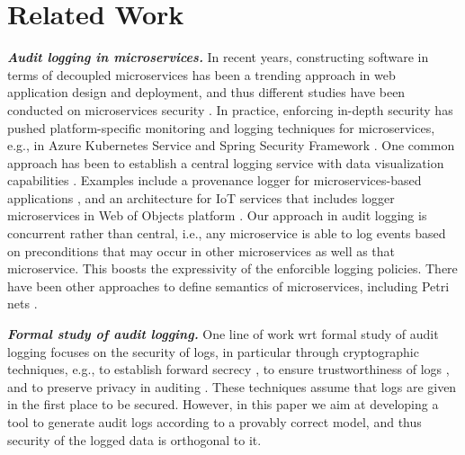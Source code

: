 \section{Related Work} \label{sec:relwork}

\textbf{\textit{Audit logging in microservices.}}
In recent years, constructing software in terms of decoupled microservices \cite{microservices, guidi2017microservices, soldani2018pains, salibindla2018microservices} has been a trending approach in web application design and deployment, and thus different studies have been conducted on microservices security \cite{micro-oreilly, nkomo2019software, nehme2019securing}. In practice, enforcing in-depth security has pushed platform-specific monitoring and logging techniques for microservices, e.g., in Azure Kubernetes Service \cite{kuber} and Spring Security Framework \cite{nguyen2019applying, baker2019novel}. One common approach has been to establish a central logging service with data visualization capabilities \cite{kazanavivcius2019migrating}. Examples include a  provenance logger for microservices-based applications \cite{curator}, and an architecture for IoT services that includes logger microservices in Web of Objects platform \cite{jarwar2017exploiting}.  Our approach in audit logging is concurrent rather than central, i.e., any microservice is able to log events based on preconditions that may occur in other microservices as well as that microservice. This boosts the expressivity of the enforcible logging policies. %
There have been other approaches to define semantics of microservices, including Petri nets \cite{camilli2017formal}.


\textit{\textbf{Formal study of audit logging.}} 
One line of work wrt formal study of audit logging focuses on the security of logs, in particular through cryptographic techniques, e.g., to establish forward secrecy \cite{Yavuz09}, to ensure trustworthiness of logs \cite{Bock:2010:TMT:1825731.1826135, Accorsi10}, and to preserve privacy in auditing \cite{Lee06}. These techniques assume that logs are given in the first place to be secured. However, in this paper we aim at developing a tool to generate audit logs according to a provably correct model, and thus security of the logged data is orthogonal to it. 

